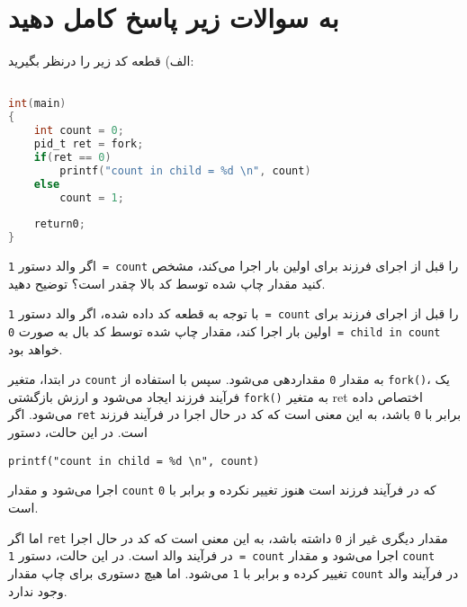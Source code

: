 \section{به سوالات زیر پاسخ کامل دهید}

الف) قطعه کد زیر را درنظر بگیرید:

\begin{latin}
\begin{lstlisting}[label=first,caption=Some Code, language=C]

int(main)
{
	int count = 0;
	pid_t ret = fork;
	if(ret == 0)
		printf("count in child = %d \n", count)
	else
		count = 1;
		
	return0;
}

\end{lstlisting}
\end{latin}




اگر والد دستور \texttt{1 = count} را قبل از اجرای فرزند برای اولین بار اجرا می‌کند، مشخص کنید مقدار چاپ شده توسط کد بالا چقدر است؟ توضیح دهید.

\begin{qsolve}
با توجه به قطعه کد داده شده، اگر والد دستور \texttt{1 = count} را ‫قبل‬ ‫از‬ ‫اجرای‬ ‫فرزند‬ ‫برای‬ ‫اولین‬ ‫بار‬ ‫اجرا‬ ‫کند،‬ مقدار چاپ شده توسط کد بال به صورت \texttt{0 = child in count} خواهد بود. 
	
در ابتدا، متغیر \texttt{count} به مقدار \texttt{0} مقداردهی می‌شود. سپس با استفاده از \texttt{fork()}، یک فرآیند فرزند ایجاد می‌شود و ارزش بازگشتی \texttt{fork()} به متغیر ret اختصاص داده می‌شود. اگر \texttt{ret} برابر با \texttt{0} باشد، به این معنی است که کد در حال اجرا در فرآیند فرزند است. در این حالت، دستور
\begin{latin}
	\texttt{printf("count in child = \%d \textbackslash n", count)}
\end{latin}
اجرا می‌شود و مقدار \texttt{count} که در فرآیند فرزند است هنوز تغییر نکرده و برابر با \texttt{0} است.

اما اگر \texttt{ret} مقدار دیگری غیر از \texttt{0} داشته باشد، به این معنی است که کد در حال اجرا در فرآیند والد است. در این حالت، دستور \texttt{1 = count} اجرا می‌شود و مقدار \texttt{count} تغییر کرده و برابر با \texttt{1} می‌شود. اما هیچ دستوری برای چاپ مقدار \texttt{count} در فرآیند والد وجود ندارد.
\end{qsolve}




















